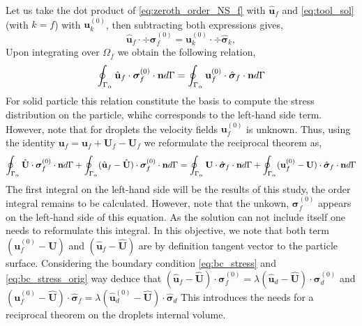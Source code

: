 Let us take the dot product of \ref{eq:zeroth_order_NS_f} with $\hat{\textbf{u}}_f$ and \ref{eq:tool_sol} (with $k = f$) with $\textbf{u}_k^{(0)}$, then subtracting both expressions gives, 
\begin{equation*}
    \hat{\textbf{u}}_f\cdot \div\bm\sigma_f^{(0)}
    =
    \textbf{u}_k^{(0)} \cdot \div \hat{\bm\sigma}_k, 
\end{equation*}
Upon integrating over $\Omega_f$ we obtain the following relation, 
\begin{equation*}
    \oint_{\Gamma_{\alpha}} \hat{\textbf{u}}_f\cdot  \bm\sigma_f^{(0)} \cdot \textbf{n} d\Gamma
    = 
    \oint_{\Gamma_{\alpha}} \textbf{u}_f^{(0)}\cdot  \hat{\bm\sigma}_f \cdot \textbf{n} d\Gamma
\end{equation*}
For solid particle this relation constitute the basis to compute the stress distribution on the particle, whihc corresponds to the left-hand side term. 
However, note that for droplets the velocity fields $\textbf{u}_f^{(0)}$ is unknown.
Thus, using the identity $\textbf{u}_f = \textbf{u}_f +\textbf{U}_f-\textbf{U}_f$ we reformulate the reciprocal theorem as, 
\begin{equation}
    \intS{\hat{\textbf{U}}\cdot  \bm\sigma_f^{(0)} \cdot \textbf{n}}
    + \intS{(\hat{\textbf{u}}_f - \hat{\textbf{U}})\cdot  \bm\sigma_f^{(0)} \cdot \textbf{n}}
    = 
    \intS{\textbf{U}\cdot  \hat{\bm\sigma}_f \cdot \textbf{n}}
    + \intS{(\textbf{u}_f^{(0)} - \textbf{U})\cdot  \hat{\bm\sigma}_f \cdot \textbf{n}}
    \label{eq:reciprocal_f}
\end{equation}
The first integral on the left-hand side will be the results of this study, the order integral remains to be calculated. 
However, note that the unkown, $\bm\sigma_f^{(0)}$ appears on the  left-hand side of this equation. 
As the solution can not include itself one needs to reformulate this integral. 
In this objective, we note that both term $(\textbf{u}_f^{(0)} - \textbf{U})$ and $(\hat{\textbf{u}}_f - \hat{\textbf{U}})$ are by definition tangent vector to the particle surface. 
Considering the boundary condition \ref{eq:bc_stress} and \ref{eq:bc_stress_orig} way deduce that $(\hat{\textbf{u}}_f - \hat{\textbf{U}})\cdot  \bm\sigma_f^{(0)} = \lambda (\hat{\textbf{u}}_d - \hat{\textbf{U}})\cdot  \bm\sigma_d^{(0)}$ and  $({\textbf{u}}_f^{(0)} - \hat{\textbf{U}})\cdot  \hat{\bm\sigma}_f = \lambda (\hat{\textbf{u}}_d^{(0)} - \hat{\textbf{U}})\cdot  \hat{\bm\sigma}_d$
This introduces the needs for a reciprocal theorem on the droplets internal volume. 

